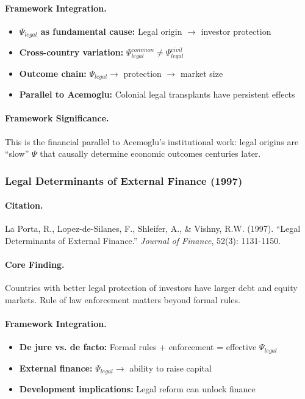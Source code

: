 \paragraph{Framework Integration.}
\begin{itemize}
  \item \textbf{$\Psi_{legal}$ as fundamental cause:} Legal origin $\to$ investor protection
  \item \textbf{Cross-country variation:} $\Psi_{legal}^{common} \neq \Psi_{legal}^{civil}$
  \item \textbf{Outcome chain:} $\Psi_{legal} \to$ protection $\to$ market size
  \item \textbf{Parallel to Acemoglu:} Colonial legal transplants have persistent effects
\end{itemize}

\paragraph{Framework Significance.}
This is the financial parallel to Acemoglu's institutional work: legal origins
are ``slow'' $\Psi$ that causally determine economic outcomes centuries later.

\subsubsection{Legal Determinants of External Finance (1997)}

\paragraph{Citation.}
La Porta, R., Lopez-de-Silanes, F., Shleifer, A., \& Vishny, R.W. (1997).
``Legal Determinants of External Finance.'' \emph{Journal of Finance}, 52(3): 1131-1150.

\paragraph{Core Finding.}
Countries with better legal protection of investors have larger debt and
equity markets. Rule of law enforcement matters beyond formal rules.

\paragraph{Framework Integration.}
\begin{itemize}
  \item \textbf{De jure vs. de facto:} Formal rules + enforcement = effective $\Psi_{legal}$
  \item \textbf{External finance:} $\Psi_{legal} \to$ ability to raise capital
  \item \textbf{Development implications:} Legal reform can unlock finance
\end{itemize}

